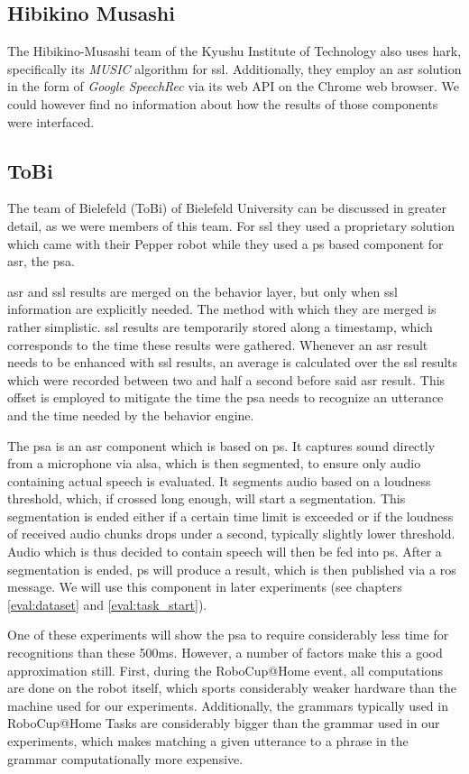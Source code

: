 \subsection{Hibikino Musashi}
The Hibikino-Musashi team of the Kyushu Institute of Technology also uses \gls{hark}, specifically its \textit{MUSIC} algorithm for \gls{ssl}.
Additionally, they employ an \gls{asr} solution in the form of \textit{Google SpeechRec} via its web API on the Chrome web browser.
We could however find no information about how the results of those components were interfaced.

\subsection{ToBi}
The team of Bielefeld (ToBi) of Bielefeld University can be discussed in greater detail, as we were members of this team.
For \gls{ssl} they used a proprietary solution which came with their Pepper robot %
while they used a \gls{ps} based component for \gls{asr}, the \gls{psa}. 

\gls{asr} and \gls{ssl} results are merged on the behavior layer, but only when \gls{ssl} information are explicitly needed.
The method with which they are merged is rather simplistic.
\gls{ssl} results are temporarily stored along a timestamp, which corresponds to the time these results were gathered.
Whenever an \gls{asr} result needs to be enhanced with \gls{ssl} results, an average is calculated over the \gls{ssl} results which were recorded between two and half a second before said \gls{asr} result.
This offset is employed to mitigate the time the \gls{psa} needs to recognize an utterance and the time needed by the behavior engine. 

The \gls{psa} is an \gls{asr} component which is based on \gls{ps}. \label{related_work:psa}
It captures sound directly from a microphone via \gls{alsa}, which is then segmented, to ensure only audio containing actual speech is evaluated.
It segments audio based on a loudness threshold, which, if crossed long enough, will start a segmentation.
This segmentation is ended either if a certain time limit is exceeded or if the loudness of received audio chunks drops under a second, typically slightly lower threshold.
Audio which is thus decided to contain speech will then be fed into \gls{ps}.
After a segmentation is ended, \gls{ps} will produce a result, which is then published via a \gls{ros} message.
We will use this component in later experiments (see chapters \ref{eval:dataset} and \ref{eval:task_start}).

One of these experiments will show the \gls{psa} to require considerably less time for recognitions than these 500ms.
However, a number of factors make this a good approximation still.
First, during the RoboCup@Home event, all computations are done on the robot itself, which sports considerably weaker hardware than the machine used for our experiments.
Additionally, the grammars typically used in RoboCup@Home Tasks are considerably bigger than the grammar used in our experiments, which makes matching a given utterance to a phrase in the grammar computationally more expensive.